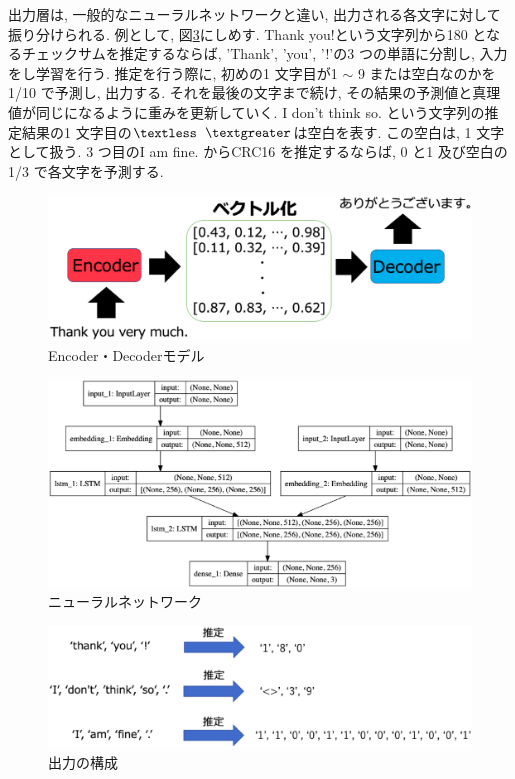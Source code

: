 \documentclass[11pt]{jbook}
\begin{document}
出力層は, 一般的なニューラルネットワークと違い, 出力される各文字に対して振り分けられる.
例として, 図\ref{output}にしめす.
Thank you!という文字列から180 となるチェックサムを推定するならば, 'Thank', 'you', '!'の3 つの単語に分割し, 入力をし学習を行う.
推定を行う際に, 初めの1 文字目が1 $\sim$ 9 または空白なのかを1/10 で予測し, 出力する.
それを最後の文字まで続け, その結果の予測値と真理値が同じになるように重みを更新していく.
I don't think so. という文字列の推定結果の1 文字目の$\textless$ $\textgreater$は空白を表す.
この空白は, 1 文字として扱う.
3 つ目のI am fine. からCRC16 を推定するならば, 0 と1 及び空白の1/3 で各文字を予測する.



\begin{figure}[htbp]
\begin{center}
\includegraphics[width=150mm]{encdec.eps}
\caption{Encoder・Decoderモデル}
\label{encdec}
\end{center}
\end{figure}

\begin{figure}[htbp]
\begin{center}
\includegraphics[width=150mm]{NN_model.eps}
\caption{ニューラルネットワーク}
\label{model}
\end{center}
\end{figure}

\begin{figure}[htbp]
\begin{center}
\includegraphics[width=150mm]{output.eps}
\caption{出力の構成}
\label{output}
\end{center}
\end{figure}
\end{document}

